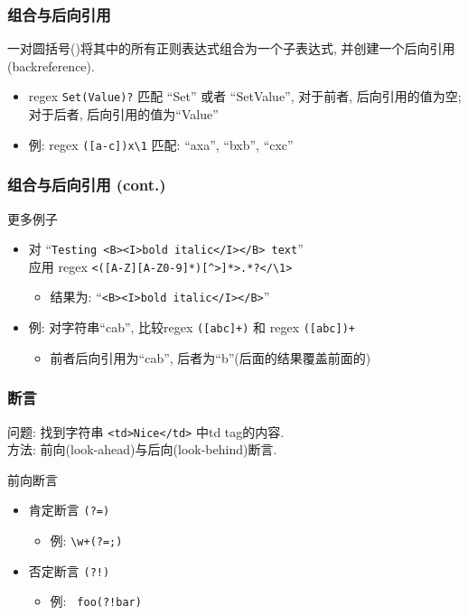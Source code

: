 \documentclass[compress]{beamer}
\begin{document}
\begin{frame}[fragile]
\frametitle{组合与后向引用}

一对圆括号()将其中的所有正则表达式组合为一个子表达式,
并创建一个后向引用(backreference).

\begin{itemize}
\item regex {\verb=Set(Value)?=} 匹配 ``Set'' 或者
``SetValue'', 对于前者, 后向引用的值为空; 对于后者,
后向引用的值为``Value'' 
\item 例: regex {\verb=([a-c])x\1=} 匹配:  ``axa'',
``bxb'', ``cxc'' 
\end{itemize}
\end{frame}

\begin{frame}[fragile]
\frametitle{组合与后向引用 (cont.)}

更多例子
\begin{itemize}

\item 对 ``\verb=Testing <B><I>bold italic</I></B> text=''\\
  应用 regex {\verb=<([A-Z][A-Z0-9]*)[^>]*>.*?</\1>=}
    \begin{itemize}
    \item 结果为: ``\verb=<B><I>bold italic</I></B>='' 
    \end{itemize}

\item 例: 对字符串``cab'', 比较regex {\verb=([abc]+)=} 和 
	regex { \verb=([abc])+=}
    \begin{itemize}
    \item 前者后向引用为``cab'', 后者为``b''(后面的结果覆盖前面的)
    \end{itemize}
\end{itemize}
\end{frame}

\begin{frame}[fragile]
    \frametitle{断言}
\noindent 问题: 找到字符串 \verb~<td>Nice</td>~ 中td tag的内容. \\
\noindent 方法: 前向(look-ahead)与后向(look-behind)断言.
\begin{block}{前向断言}
    \begin{itemize}
        \item 肯定断言 \verb~(?=)~
            \begin{itemize}
                \item 例: \verb~\w+(?=;)~
    \end{itemize}
        \item 否定断言 \verb~(?!)~
            \begin{itemize}
                \item 例: \verb~ foo(?!bar)~ 
            \end{itemize}
    \end{itemize}
\end{block}
\end{frame}
\end{document}
